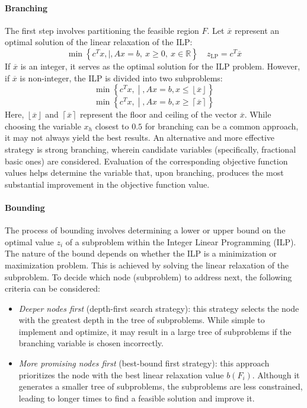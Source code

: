 \paragraph*{Branching}
The first step involves partitioning the feasible region $F$. 
Let $\overline{x}$ represent an optimal solution of the linear relaxation of the ILP:
\[ \min\left\{ c^T x, \mid, Ax = b, \ x \geq 0, \ x \in \mathbb{R} \right\} \quad z_{\text{LP}} = c^T \overline{x} \]
If $\overline{x}$ is an integer, it serves as the optimal solution for the ILP problem. 
However, if $\overline{x}$ is non-integer, the ILP is divided into two subproblems:
\[\min\left\{ c^T x, \middle\vert, Ax = b, x \leq \left\lfloor \overline{x} \right\rfloor \right\} \label{eq:branch1}\]
\[\min\left\{ c^T x, \middle\vert, Ax = b, x \geq \left\lceil \overline{x} \right\rceil \right\} \label{eq:branch2}\]
Here, $ \left\lfloor \overline{x} \right\rfloor $ and $ \left\lceil \overline{x} \right\rceil $ represent the floor and ceiling of the vector $\overline{x}$.
While choosing the variable $x_h$ closest to $0.5$ for branching can be a common approach, it may not always yield the best results.
An alternative and more effective strategy is strong branching, wherein candidate variables (specifically, fractional basic ones) are considered. 
Evaluation of the corresponding objective function values helps determine the variable that, upon branching, produces the most substantial improvement in the objective function value.

\paragraph*{Bounding}
The process of bounding involves determining a lower or upper bound on the optimal value $z_i$ of a subproblem within the Integer Linear Programming (ILP). 
The nature of the bound depends on whether the ILP is a minimization or maximization problem. 
This is achieved by solving the linear relaxation of the subproblem.
To decide which node (subproblem) to address next, the following criteria can be considered:
\begin{itemize}
    \item \textit{Deeper nodes first} (depth-first search strategy): this strategy selects the node with the greatest depth in the tree of subproblems. 
        While simple to implement and optimize, it may result in a large tree of subproblems if the branching variable is chosen incorrectly.
    \item \textit{More promising nodes first} (best-bound first strategy): this approach prioritizes the node with the best linear relaxation value $b(F_i)$. 
        Although it generates a smaller tree of subproblems, the subproblems are less constrained, leading to longer times to find a feasible solution and improve it.
\end{itemize}


